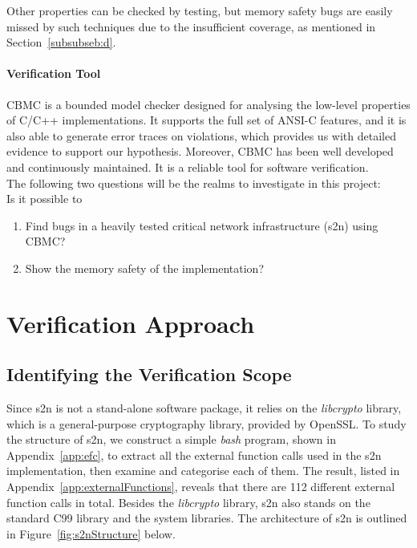 Other properties can be checked by testing, but memory safety bugs are easily missed by such techniques due to the insufficient coverage, as mentioned in Section~\ref{subsubseb:d}.

\paragraph{Verification Tool} CBMC is a bounded model checker designed for analysing the low-level properties of C/C++ implementations. It supports the full set of ANSI-C features, and it is also able to generate error traces on violations, which provides us with detailed evidence to support our hypothesis. Moreover, CBMC has been well developed and continuously maintained. It is a reliable tool for software verification.\\

\noindent The following two questions will be the realms to investigate in this project:\\ Is it possible to
\begin{enumerate}
    \item Find bugs in a heavily tested critical network infrastructure (s2n) using CBMC?
    \item Show the memory safety of the implementation?
\end{enumerate}


\section{Verification Approach}
\subsection{Identifying the Verification Scope}
Since s2n is not a stand-alone software package, it relies on the \textit{libcrypto} library, which is a general-purpose cryptography library, provided by OpenSSL. To study the structure of s2n, we construct a simple \textit{bash} program, shown in Appendix~\ref{app:efc}, to extract all the external function calls used in the s2n implementation, then examine and categorise each of them. The result, listed in Appendix~\ref{app:externalFunctions}, reveals that there are 112 different external function calls in total. Besides the \textit{libcrypto} library, s2n also stands on the standard C99 library and the system libraries. The architecture of s2n is outlined in Figure~\ref{fig:s2nStructure} below.



